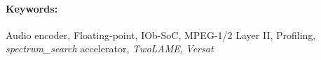 \paragraph{\hspace{0.5cm} \Large{Keywords:}} Audio encoder, Floating-point, IOb-SoC, MPEG-1/2 Layer II, Profiling, \textit{spectrum\_search} accelerator, \textit{TwoLAME}, \textit{Versat}
